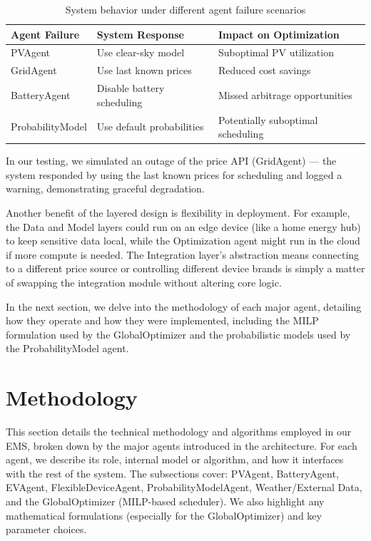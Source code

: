 \documentclass[12pt,a4paper]{article}
\begin{document}
\begin{table}[H]
\centering
\caption{System behavior under different agent failure scenarios}
\label{tab:v12-faults}
\begin{tabularx}{\textwidth}{lXX}
\toprule
\textbf{Agent Failure} & \textbf{System Response} & \textbf{Impact on Optimization} \\
\midrule
PVAgent & Use clear-sky model & Suboptimal PV utilization \\
GridAgent & Use last known prices & Reduced cost savings \\
BatteryAgent & Disable battery scheduling & Missed arbitrage opportunities \\
ProbabilityModel & Use default probabilities & Potentially suboptimal scheduling \\
\bottomrule
\end{tabularx}
\end{table}

In our testing, we simulated an outage of the price API (GridAgent) — the system responded by using the last known prices for scheduling and logged a warning, demonstrating graceful degradation.

Another benefit of the layered design is flexibility in deployment. For example, the Data and Model layers could run on an edge device (like a home energy hub) to keep sensitive data local, while the Optimization agent might run in the cloud if more compute is needed. The Integration layer’s abstraction means connecting to a different price source or controlling different device brands is simply a matter of swapping the integration module without altering core logic.

In the next section, we delve into the methodology of each major agent, detailing how they operate and how they were implemented, including the MILP formulation used by the GlobalOptimizer and the probabilistic models used by the ProbabilityModel agent.

\clearpage

\section{Methodology}
This section details the technical methodology and algorithms employed in our EMS, broken down by the major agents introduced in the architecture. For each agent, we describe its role, internal model or algorithm, and how it interfaces with the rest of the system. The subsections cover: PVAgent, BatteryAgent, EVAgent, FlexibleDeviceAgent, ProbabilityModelAgent, Weather/External Data, and the GlobalOptimizer (MILP-based scheduler). We also highlight any mathematical formulations (especially for the GlobalOptimizer) and key parameter choices.
\end{document}

